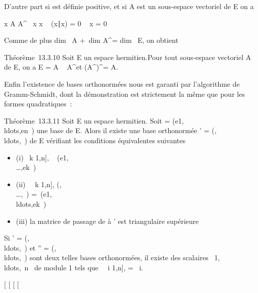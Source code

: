 D'autre part si \Phi est définie positive, et si A est un sous-espace
vectoriel de E on a

x \in A \bigcap A^\bot\rigtharrow~ x \bot x \rigtharrow~ (x∣x) = 0 \rigtharrow~ x
= 0

Comme de plus dim~ A +\
dim A^\bot = dim~ E, on obtient

Théorème~13.3.10 Soit E un espace hermitien.Pour tout sous-espace
vectoriel A de E, on a E = A \oplus~ A^\bot et
(A^\bot)^\bot = A.

Enfin l'existence de bases orthonormées nous est garanti par
l'algorithme de Gramm-Schmidt, dont la démonstration est strictement la
même que pour les formes quadratiques~:

Théorème~13.3.11 Soit E un espace hermitien. Soit  =
(e1,\\ldots,en~)
une base de E. Alors il existe une base orthonormée ' =
(\epsilon1,\\ldots,\epsilonn~)
de E vérifiant les conditions équivalentes suivantes

\begin{itemize}
\itemsep1pt\parskip0pt
\item
  (i) \forall~k \in {[}1,n{]}, \epsilonk~
  \in\mathrmVect(e1,\\\ldots,ek~)
\item
  (ii) \forall~~k \in {[}1,n{]},
  \mathrmVect(,\\\ldots,\epsilonk~)
  =\
  \mathrmVect(e1,\\ldots,ek~)
\item
  (iii) la matrice de passage de  à ' est triangulaire supérieure
\end{itemize}

Si ' =
(,\\ldots,\epsilonn~)
et \mathcal{E}'' =
(,\\ldots,\etan~)
sont deux telles bases orthonormées, il existe des scalaires
\lambda~1,\\ldots,\lambda~n~
de module 1 tels que \forall~~i \in {[}1,n{]},
\etai = \lambda~i\epsiloni.

{[}
{[}
{[}
{[}
